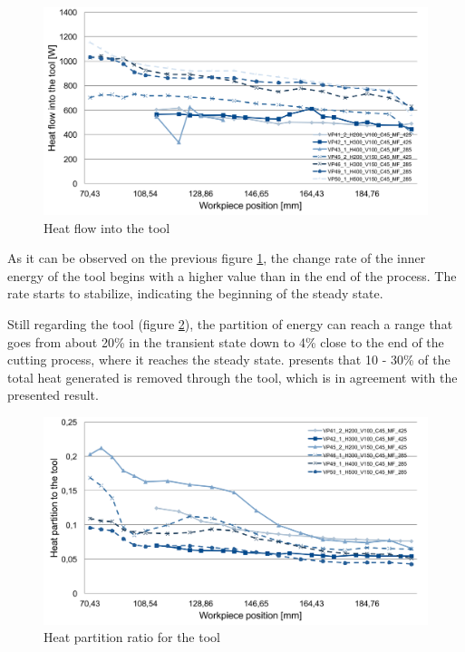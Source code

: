 		\begin{figure}[H]
			\centering
			\captionsetup{justification=centering}
			\includegraphics[scale=0.55]{Imagens/energyTool2.png}
			\caption{Heat flow into the tool}
			\label{fig:hflowTool}
		\end{figure}

		As it can be observed on the previous figure \ref{fig:hflowTool}, the change rate of the inner energy of the tool begins with a higher value than in the end of the process. The rate starts to stabilize, indicating the beginning of the steady state. 

		Still regarding the tool (figure \ref{fig:hpartTool}), the partition of energy can reach a range that goes from about 20\% in the transient state down to 4\% close to the end of the cutting process, where it reaches the steady state.  presents that 10 - 30\% of the total heat generated is removed through the tool, which is in agreement with the presented result.

		\begin{figure}[H]
			\centering
			\captionsetup{justification=centering}
			\includegraphics[scale=0.55]{Imagens/partTool.png}
			\caption{Heat partition ratio for the tool}
			\label{fig:hpartTool}
		\end{figure}

